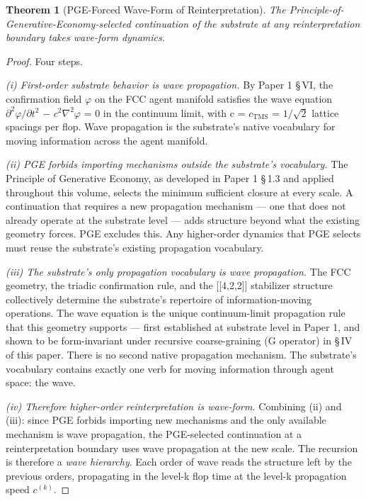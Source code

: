 \documentclass[11pt,oneside]{report}
\newtheorem{theorem}{Theorem}[section]
\theoremstyle{definition}
\theoremstyle{remark}
\begin{document}
\begin{theorem}[PGE-Forced Wave-Form of Reinterpretation]
The
Principle-of-Generative-Economy-selected continuation of the substrate
at any reinterpretation boundary takes wave-form dynamics.
\end{theorem}

\begin{proof}
Four steps.

\emph{(i) First-order substrate behavior is wave propagation.} By Paper
1 \S\,VI, the confirmation field \ensuremath{\varphi} on the FCC agent manifold satisfies the
wave equation \ensuremath{\partial ^{2}\varphi /\partial t^{2}} \ensuremath{-} \ensuremath{c^{2}\nabla ^{2}\varphi} = 0 in the continuum limit, with c = \ensuremath{c_{\mathrm{TMS}}}
= \ensuremath{1/\sqrt{2}} lattice spacings per flop. Wave propagation is the substrate's
native vocabulary for moving information across the agent manifold.

\emph{(ii) PGE forbids importing mechanisms outside the substrate's
vocabulary.} The Principle of Generative Economy, as developed in Paper
1 \S\,1.3 and applied throughout this volume, selects the minimum
sufficient closure at every scale. A continuation that requires a new
propagation mechanism --- one that does not already operate at the
substrate level --- adds structure beyond what the existing geometry
forces. PGE excludes this. Any higher-order dynamics that PGE selects
must reuse the substrate's existing propagation vocabulary.

\emph{(iii) The substrate's only propagation vocabulary is wave
propagation.} The FCC geometry, the triadic confirmation rule, and the
[[4,2,2]] stabilizer structure collectively determine the
substrate's repertoire of information-moving operations. The wave
equation is the unique continuum-limit propagation rule that this
geometry supports --- first established at substrate level in Paper 1,
and shown to be form-invariant under recursive coarse-graining (G
operator) in \S\,IV of this paper. There is no second native propagation
mechanism. The substrate's vocabulary contains exactly one verb for
moving information through agent space: the wave.

\emph{(iv) Therefore higher-order reinterpretation is wave-form.}
Combining (ii) and (iii): since PGE forbids importing new mechanisms and
the only available mechanism is wave propagation, the PGE-selected
continuation at a reinterpretation boundary uses wave propagation at the
new scale. The recursion is therefore a \emph{wave hierarchy}. Each
order of wave reads the structure left by the previous orders,
propagating in the level-k flop time at the level-k propagation speed
\ensuremath{c^{(k)}.}

\end{proof}
\end{document}
